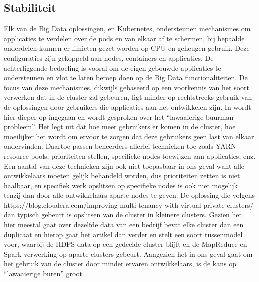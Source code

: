 \subsection{Stabiliteit}
Elk van de Big Data oplossingen, en Kubernetes, ondersteunen mechanismes om applicaties te verdelen over de pods en van elkaar af te schermen, bij bepaalde onderdelen kunnen er limieten gezet worden op CPU en geheugen gebruik. Deze configuraties zijn gekoppeld aan nodes, containers en applicaties. De achterliggende bedoeling is vooral om de eigen gebouwde applicaties te ondersteunen en vlot te laten beroep doen op de Big Data functionaliteiten. De focus van deze mechanismes, dikwijls gebaseerd op een voorkennis van het soort verwerken dat in de cluster zal gebeuren, ligt minder op rechtstreeks gebruik van de oplossingen door gebruikers die applicaties aan het ontwikkelen zijn.
\newline
\newline
In  wordt hier dieper op ingegaan en wordt gesproken over het ``lawaaierige buurman probleem''. Het legt uit dat hoe meer gebruikers er komen in de cluster, hoe moeilijker het wordt om ervoor te zorgen dat deze gebruikers geen last van elkaar ondervinden. Daartoe passen beheerders allerlei technieken toe zoals YARN resource pools, prioriteiten stellen, specifieke nodes toewijzen aan applicaties, enz. Een aantal van deze technieken zijn ook niet toepasbaar in ons geval want alle ontwikkelaars moeten gelijk behandeld worden, dus prioriteiten zetten is niet haalbaar, en specifiek werk opslitsen op specifieke nodes is ook niet mogelijk tenzij dan door alle ontwikkelaars aparte nodes te geven.
De oplossing die volgens https://blog.cloudera.com/improving-multi-tenancy-with-virtual-private-clusters/ dan typisch gebeurt is opslitsen van de cluster in kleinere clusters. Gezien het hier meestal gaat over dezelfde data van een bedrijf bevat elke cluster dan een duplicaat en hierop gaat het artikel dan verder en stelt een soort tussenmodel voor, waarbij de HDFS data op een gedeelde cluster blijft en de MapReduce en Spark verwerking op aparte clusters gebeurt.
\newline
Aangezien het in ons geval gaat om het gebruik van de cluster door minder ervaren ontwikkelaars, is de kans op ``lawaaierige buren'' groot.


